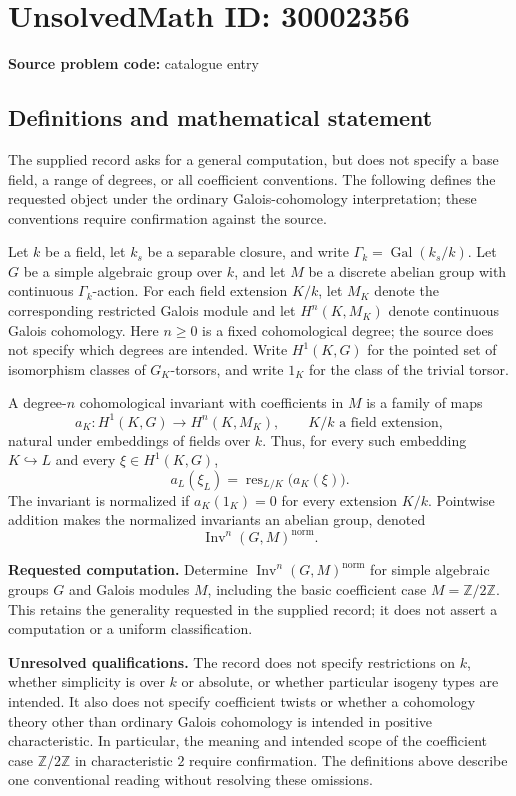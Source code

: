 \documentclass[11pt]{article}
\newcommand{\Z}{\mathbb{Z}}
\begin{document}
\section*{UnsolvedMath ID: 30002356}
\textbf{Source problem code:} catalogue entry
\subsection{Definitions and mathematical statement}
The supplied record asks for a general computation, but does not specify a base field, a range of degrees, or all coefficient conventions. The following defines the requested object under the ordinary Galois-cohomology interpretation; these conventions require confirmation against the source.

Let \(k\) be a field, let \(k_s\) be a separable closure, and write \(\Gamma_k=\operatorname{Gal}(k_s/k)\). Let \(G\) be a simple algebraic group over \(k\), and let \(M\) be a discrete abelian group with continuous \(\Gamma_k\)-action. For each field extension \(K/k\), let \(M_K\) denote the corresponding restricted Galois module and let \(H^n(K,M_K)\) denote continuous Galois cohomology. Here \(n\geq 0\) is a fixed cohomological degree; the source does not specify which degrees are intended. Write \(H^1(K,G)\) for the pointed set of isomorphism classes of \(G_K\)-torsors, and write \(1_K\) for the class of the trivial torsor.

A degree-\(n\) cohomological invariant with coefficients in \(M\) is a family of maps
\[
 a_K:H^1(K,G)\longrightarrow H^n(K,M_K),\qquad K/k\text{ a field extension},
\]
natural under embeddings of fields over \(k\). Thus, for every such embedding \(K\hookrightarrow L\) and every \(\xi\in H^1(K,G)\),
\[
 a_L(\xi_L)=\operatorname{res}_{L/K}\bigl(a_K(\xi)\bigr).
\]
The invariant is normalized if \(a_K(1_K)=0\) for every extension \(K/k\). Pointwise addition makes the normalized invariants an abelian group, denoted
\[
 \operatorname{Inv}^{n}(G,M)^{\mathrm{norm}}.
\]

\textbf{Requested computation.} Determine \(\operatorname{Inv}^{n}(G,M)^{\mathrm{norm}}\) for simple algebraic groups \(G\) and Galois modules \(M\), including the basic coefficient case \(M=\Z/2\Z\). This retains the generality requested in the supplied record; it does not assert a computation or a uniform classification.

\textbf{Unresolved qualifications.} The record does not specify restrictions on \(k\), whether simplicity is over \(k\) or absolute, or whether particular isogeny types are intended. It also does not specify coefficient twists or whether a cohomology theory other than ordinary Galois cohomology is intended in positive characteristic. In particular, the meaning and intended scope of the coefficient case \(\Z/2\Z\) in characteristic \(2\) require confirmation. The definitions above describe one conventional reading without resolving these omissions.
\end{document}
